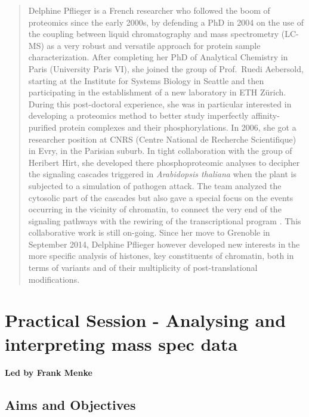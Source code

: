 \documentclass[12pt,]{book}
\theoremstyle{definition}
\theoremstyle{definition}
\theoremstyle{remark}
\begin{document}
\begin{quote}
Delphine Pflieger is a French researcher who followed the boom of
proteomics since the early 2000s, by defending a PhD in 2004 on the use
of the coupling between liquid chromatography and mass spectrometry
(LC-MS) as a very robust and versatile approach for protein sample
characterization. After completing her PhD of Analytical Chemistry in
Paris (University Paris VI), she joined the group of Prof.~Ruedi
Aebersold, starting at the Institute for Systems Biology in Seattle and
then participating in the establishment of a new laboratory in ETH
Zürich. During this post-doctoral experience, she was in particular
interested in developing a proteomics method to better study imperfectly
affinity-purified protein complexes and their phosphorylations. In 2006,
she got a researcher position at CNRS (Centre National de Recherche
Scientifique) in Evry, in the Parisian suburb. In tight collaboration
with the group of Heribert Hirt, she developed there phosphoproteomic
analyses to decipher the signaling cascades triggered in
\emph{Arabidopsis thaliana} when the plant is subjected to a simulation
of pathogen attack. The team analyzed the cytosolic part of the cascades
but also gave a special focus on the events occurring in the vicinity of
chromatin, to connect the very end of the signaling pathways with the
rewiring of the transcriptional program
\citep{Bigeard:2014bl, Bigeard:2014df, Rayapuram:2014dc}. This
collaborative work is still on-going. Since her move to Grenoble in
September 2014, Delphine Pflieger however developed new interests in the
more specific analysis of histones, key constituents of chromatin, both
in terms of variants and of their multiplicity of post-translational
modifications.
\end{quote}

\section*{Practical Session - Analysing and interpreting mass spec
data}\label{practical-session---analysing-and-interpreting-mass-spec-data}

\textbf{Led by Frank Menke}

\subsection*{Aims and Objectives}\label{aims-and-objectives-6}
\end{document}
